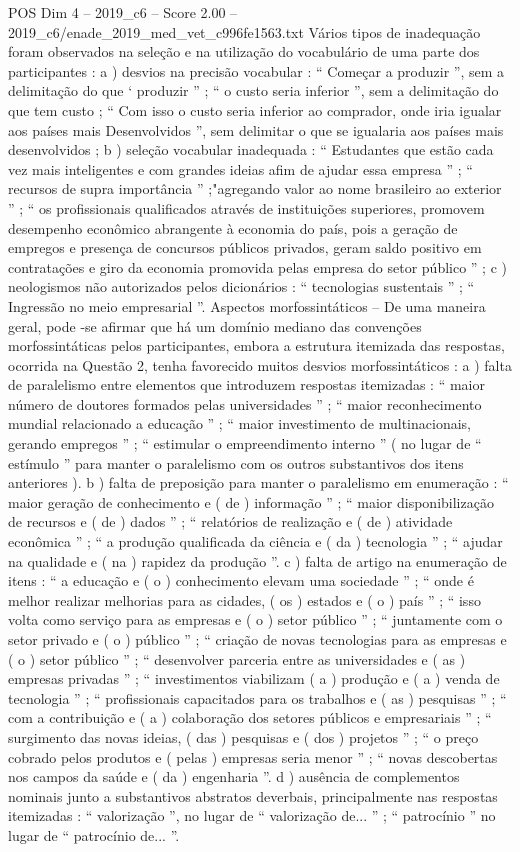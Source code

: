 \begin{textsample}{POS Dim 4 – 2019\_c6 – Score 2.00 – 2019\_c6/enade\_2019\_med\_vet\_c996fe1563.txt}
Vários tipos de inadequação foram observados na seleção e na utilização do vocabulário de uma parte dos participantes : a ) desvios na precisão vocabular : “ Começar a produzir ”, sem a delimitação do que ‘ produzir ” ; “ o custo seria inferior ”, sem a delimitação do que tem custo ; “ Com isso o custo seria inferior ao comprador, onde iria igualar aos países mais Desenvolvidos ”, sem delimitar o que se igualaria aos países mais desenvolvidos ; b ) seleção vocabular inadequada : “ Estudantes que estão cada vez mais inteligentes e com grandes ideias afim de ajudar essa empresa ” ; “ recursos de supra importância ” ;"agregando valor ao nome brasileiro ao exterior ” ; “ os profissionais qualificados através de instituições superiores, promovem desempenho econômico abrangente à economia do país, pois a geração de empregos e presença de concursos públicos privados, geram saldo positivo em contratações e giro da economia promovida pelas empresa do setor público ” ; c ) neologismos não autorizados pelos dicionários : “ tecnologias sustentais ” ; “ Ingressão no meio empresarial ”.
Aspectos morfossintáticos – De uma maneira geral, pode -se afirmar que há um domínio mediano das convenções morfossintáticas pelos participantes, embora a estrutura itemizada das respostas, ocorrida na Questão 2, tenha favorecido muitos desvios morfossintáticos : a ) falta de paralelismo entre elementos que introduzem respostas itemizadas : “ maior número de doutores formados pelas universidades ” ; “ maior reconhecimento mundial relacionado a educação ” ; “ maior investimento de multinacionais, gerando empregos ” ; “ estimular o empreendimento interno ” ( no lugar de “ estímulo ” para manter o paralelismo com os outros substantivos dos itens anteriores ). b ) falta de preposição para manter o paralelismo em enumeração : “ maior geração de conhecimento e ( de ) informação ” ; “ maior disponibilização de recursos e ( de ) dados ” ; “ relatórios de realização e ( de ) atividade econômica ” ; “ a produção qualificada da ciência e ( da ) tecnologia ” ; “ ajudar na qualidade e ( na ) rapidez da produção ”. c ) falta de artigo na enumeração de itens : “ a educação e ( o ) conhecimento elevam uma sociedade ” ; “ onde é melhor realizar melhorias para as cidades, ( os ) estados e ( o ) país ” ; “ isso volta como serviço para as empresas e ( o ) setor público ” ; “ juntamente com o setor privado e ( o ) público ” ; “ criação de novas tecnologias para as empresas e ( o ) setor público ” ; “ desenvolver parceria entre as universidades e ( as ) empresas privadas ” ; “ investimentos viabilizam ( a ) produção e ( a ) venda de tecnologia ” ; “ profissionais capacitados para os trabalhos e ( as ) pesquisas ” ; “ com a contribuição e ( a ) colaboração dos setores públicos e empresariais ” ; “ surgimento das novas ideias, ( das ) pesquisas e ( dos ) projetos ” ; “ o preço cobrado pelos produtos e ( pelas ) empresas seria menor ” ; “ novas descobertas nos campos da saúde e ( da ) engenharia ”. d ) ausência de complementos nominais junto a substantivos abstratos deverbais, principalmente nas respostas itemizadas : “ valorização ”, no lugar de “ valorização de... ” ; “ patrocínio ” no lugar de “ patrocínio de... ”.

\end{textsample}
